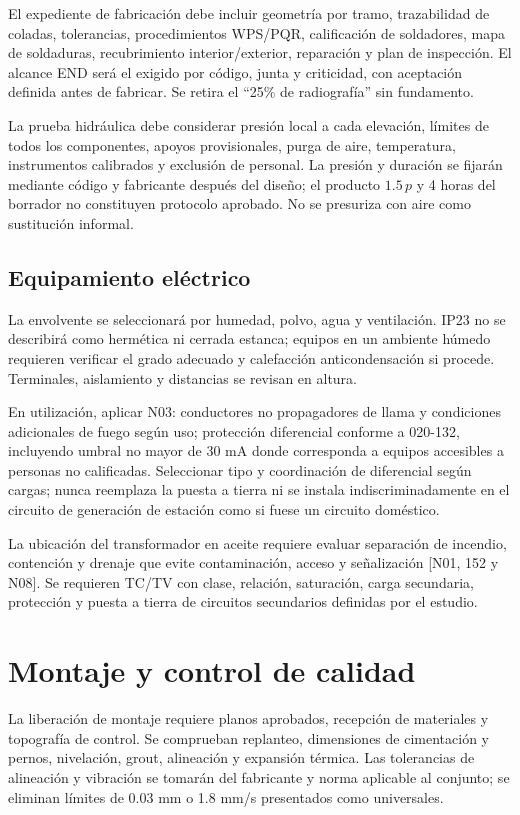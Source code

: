 El expediente de fabricación debe incluir geometría por tramo, trazabilidad de coladas, tolerancias, procedimientos WPS/PQR, calificación de soldadores, mapa de soldaduras, recubrimiento interior/exterior, reparación y plan de inspección. El alcance END será el exigido por código, junta y criticidad, con aceptación definida antes de fabricar. Se retira el ``25\% de radiografía'' sin fundamento.

La prueba hidráulica debe considerar presión local a cada elevación, límites de todos los componentes, apoyos provisionales, purga de aire, temperatura, instrumentos calibrados y exclusión de personal. La presión y duración se fijarán mediante código y fabricante después del diseño; el producto $1.5\,p$ y 4 horas del borrador no constituyen protocolo aprobado. No se presuriza con aire como sustitución informal.

\subsection{Equipamiento eléctrico}
La envolvente se seleccionará por humedad, polvo, agua y ventilación. IP23 no se describirá como hermética ni cerrada estanca; equipos en un ambiente húmedo requieren verificar el grado adecuado y calefacción anticondensación si procede. Terminales, aislamiento y distancias se revisan en altura.

En utilización, aplicar N03: conductores no propagadores de llama y condiciones adicionales de fuego según uso; protección diferencial conforme a 020-132, incluyendo umbral no mayor de 30 mA donde corresponda a equipos accesibles a personas no calificadas. Seleccionar tipo y coordinación de diferencial según cargas; nunca reemplaza la puesta a tierra ni se instala indiscriminadamente en el circuito de generación de estación como si fuese un circuito doméstico.

La ubicación del transformador en aceite requiere evaluar separación de incendio, contención y drenaje que evite contaminación, acceso y señalización [N01, 152 y N08]. Se requieren TC/TV con clase, relación, saturación, carga secundaria, protección y puesta a tierra de circuitos secundarios definidas por el estudio.

\section{Montaje y control de calidad}
La liberación de montaje requiere planos aprobados, recepción de materiales y topografía de control. Se comprueban replanteo, dimensiones de cimentación y pernos, nivelación, grout, alineación y expansión térmica. Las tolerancias de alineación y vibración se tomarán del fabricante y norma aplicable al conjunto; se eliminan límites de 0.03 mm o 1.8 mm/s presentados como universales.

